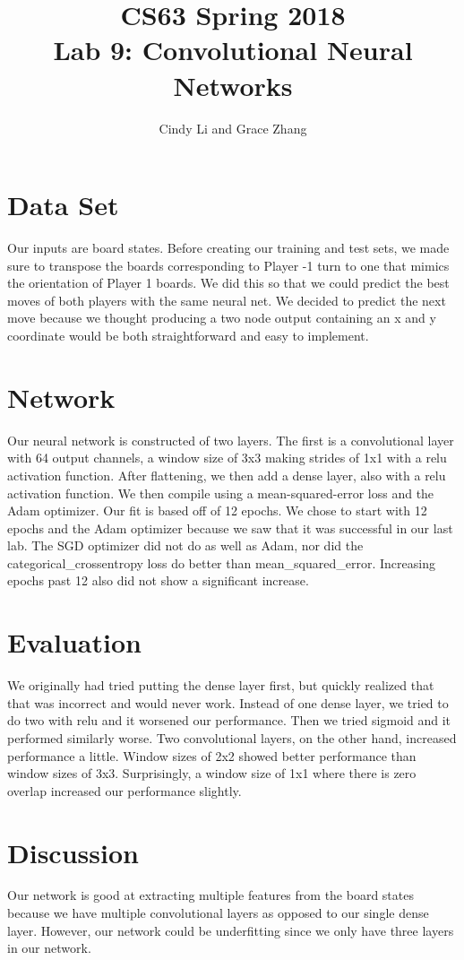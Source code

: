 \documentclass[11pt]{article}
\title{CS63 Spring 2018\\Lab 9: Convolutional Neural Networks}
\author{Cindy Li and Grace Zhang}
\date{}
\begin{document}
\maketitle

\section{Data Set}

Our inputs are board states. Before creating our training and test sets, we made sure to transpose the boards corresponding to Player -1 turn to one that mimics the orientation of Player 1 boards. We did this so that we could predict the best moves of both players with the same neural net.
We decided to predict the next move because we thought producing a two node output containing an x and y coordinate would be both straightforward and easy to implement.

\section{Network}

Our neural network is constructed of two layers. The first is a convolutional layer with 64 output channels, a window size of 3x3 making strides of 1x1 with a relu activation function. After flattening, we then add a dense layer, also with a relu activation function. We then compile using a mean-squared-error loss and the Adam optimizer. Our fit is based off of 12 epochs.
We chose to start with 12 epochs and the Adam optimizer because we saw that it was successful in our last lab. The SGD optimizer did not do as well as Adam, nor did the categorical\_crossentropy loss do better than mean\_squared\_error. Increasing epochs past 12 also did not show a significant increase.


\section{Evaluation}

We originally had tried putting the dense layer first, but quickly realized that that was incorrect and would never work. Instead of one dense layer, we tried to do two with relu and it worsened our performance. Then we tried sigmoid and it performed similarly worse. Two convolutional layers, on the other hand, increased performance a little. Window sizes of 2x2 showed better performance than window sizes of 3x3. Surprisingly, a window size of 1x1 where there is zero overlap increased our performance slightly.


\section{Discussion}

Our network is good at extracting multiple features from the board states because we have multiple convolutional layers as opposed to our single dense layer. However, our network could be underfitting since we only have three layers in our network.
\end{document}

